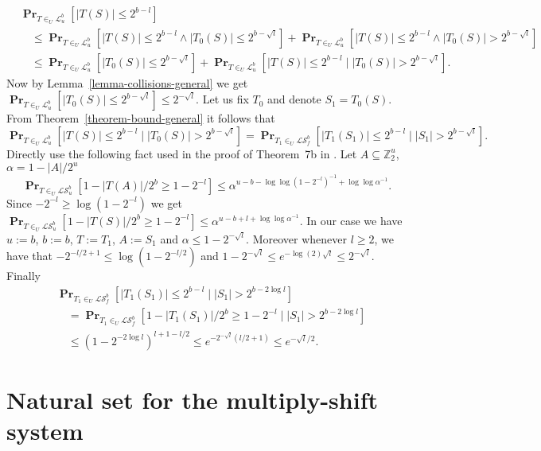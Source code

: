 \documentclass{article}
\newcommand{\vecspace}[2]{\mathbb{Z}_{#1}^{#2}}
\newcommand{\binvecspace}[1]{\vecspace{2}{#1}}
\newcommand{\linearmaps}[2]{\mathcal{L}_{#1}^{#2}}
\newcommand{\surjectivelinearmaps}[2]{\mathcal{LS}_{#1}^{#2}}
\newcommand{\probs}[2]{\operatorname{\mathbf{Pr}}_{{#1}}\left[{#2}\right]}
\begin{document}
\begin{align*}
& \probs{T \in_U \linearmaps{u}{b}}{|T(S)| \leq 2^{b - l}} \\
& \quad \leq \probs{T \in_U \linearmaps{u}{b}}{|T(S)| \leq 2^{b - l} \wedge |T_0(S)| \leq 2^{b - \sqrt{l}}} + \probs{T \in_U \linearmaps{u}{b}}{|T(S)| \leq 2^{b - l} \wedge |T_0(S)| > 2^{b - \sqrt{l}}} \\
& \quad \leq \probs{T \in_U \linearmaps{u}{b}}{|T_0(S)| \leq 2^{b - \sqrt{l}}} + \probs{T \in_U \linearmaps{u}{b}}{|T(S)| \leq 2^{b - l} \mid |T_0(S)| > 2^{b - \sqrt{l}}}.
\end{align*}
Now by Lemma~\ref{lemma-collisions-general} we get
$
\probs{T \in_U \linearmaps{u}{b}}{|T_0(S)| \leq 2^{b - \sqrt{l}}} \leq 2^{-\sqrt{l}}.
$
Let us fix $T_0$ and denote $S_1 = T_0(S)$. From Theorem~\ref{theorem-bound-general} it follows that 
\[
\probs{T \in_U \linearmaps{u}{b}}{|T(S)| \leq 2^{b - l} \mid |T_0(S)| > 2^{b - \sqrt{l}}} = 
\probs{T_1 \in_U \surjectivelinearmaps{f}{b}}{|T_1(S_1)| \leq 2^{b - l} \mid |S_1| > 2^{b - \sqrt{l}}}.
\]
Directly use the following fact used in the proof of Theorem~7b in \cite{alonetal}.
Let $A \subseteq \binvecspace{u}$, $\alpha = 1 - |A|/2^u$
\[
\probs{T \in_U \surjectivelinearmaps{u}{b}}{1 - |T(A)|/2^b \geq 1 - 2^{-l}} \leq \alpha^{u - b - \log \log \left(1 - 2^{-l}\right)^{-1} + \log \log \alpha^{-1}}.
\]
Since $-2^{-l} \geq \log(1 - 2^{-l})$ we get
$
\probs{T \in_U \surjectivelinearmaps{u}{b}}{1 - |T(S)|/2^b \geq 1 - 2^{-l}} \leq \alpha^{u - b + l + \log \log \alpha^{-1}}.
$
In our case we have $u := b$, $b := b$, $T := T_1$, $A := S_1$ and $\alpha \leq 1-2^{-\sqrt{l}}$.
Moreover whenever $l \geq 2$, we have that $-2^{-l/2 + 1} \leq \log (1 - 2^{-l/2})$ and $1-2^{-\sqrt{l}} \leq e^{-\log(2)\sqrt{l}} \leq 2^{-\sqrt{l}}$.
Finally
\begin{align*}
& \probs{T_1 \in_U \surjectivelinearmaps{f}{b}}{|T_1(S_1)| \leq 2^{b - l} \mid |S_1| > 2^{b - 2\log l}} \\
& \quad = \probs{T_1 \in_U \surjectivelinearmaps{f}{b}}{1 - |T_1(S_1)|/2^b \geq 1 - 2^{-l} \mid |S_1| > 2^{b - 2\log l}} \\
& \quad \leq \left(1 - 2^{-2\log l}\right)^{l + 1 - l/2} \leq e^{-2^{-\sqrt{l}}(l/2 + 1)} \leq e^{-\sqrt{l}/2}.
\end{align*}

\section{Natural set for the multiply-shift system}
\end{document}
